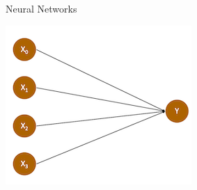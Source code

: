 \documentclass[handout]{beamer}
\begin{document}
\begin{frame}{Neural Networks}
	
	\begin{center}
		\includegraphics{../pictures/perceptron.png} \\\
	\end{center}
	




\end{frame}
\end{document}

